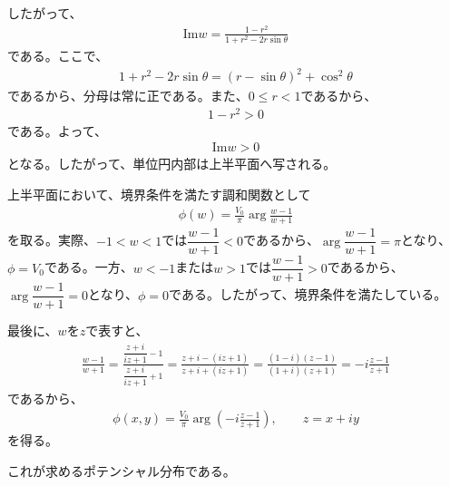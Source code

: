 \documentclass[platex,dvipdfmx,a4paper]{jsarticle}
\begin{document}
  したがって、
  \begin{align*}
    \mathrm{Im} w=\frac{1-r^2}{1+r^2-2r\sin\theta}
  \end{align*}
  である。ここで、
  \begin{align*}
    1+r^2-2r\sin\theta=(r-\sin\theta)^2+\cos^2\theta
  \end{align*}
  であるから、分母は常に正である。また、$0\le r<1$であるから、
  \begin{align*}
    1-r^2>0
  \end{align*}
  である。よって、
  \begin{align*}
    \mathrm{Im} w>0
  \end{align*}
  となる。したがって、単位円内部は上半平面へ写される。

  上半平面において、境界条件を満たす調和関数として
  \begin{align*}
    \phi(w)=\frac{V_0}{\pi}\arg\frac{w-1}{w+1}
  \end{align*}
  を取る。実際、$-1<w<1$では$\dfrac{w-1}{w+1}<0$であるから、$\arg\dfrac{w-1}{w+1}=\pi$となり、$\phi=V_0$である。一方、$w<-1$または$w>1$では$\dfrac{w-1}{w+1}>0$であるから、$\arg\dfrac{w-1}{w+1}=0$となり、$\phi=0$である。したがって、境界条件を満たしている。

  最後に、$w$を$z$で表すと、
  \begin{align*}
    \frac{w-1}{w+1}=\frac{\dfrac{z+i}{iz+1}-1}{\dfrac{z+i}{iz+1}+1}=\frac{z+i-(iz+1)}{z+i+(iz+1)}=\frac{(1-i)(z-1)}{(1+i)(z+1)}=-i\frac{z-1}{z+1}
  \end{align*}
  であるから、
  \begin{align*}
    \phi(x,y)=\frac{V_0}{\pi}\arg\left(-i\frac{z-1}{z+1}\right),\qquad z=x+iy
  \end{align*}
  を得る。

  これが求めるポテンシャル分布である。
\end{document}
